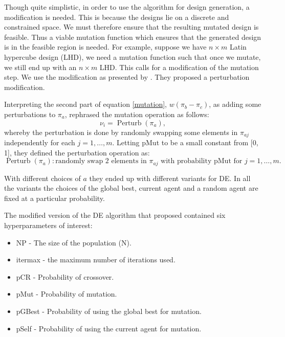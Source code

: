 \documentclass [PhD] {package/uclathes}
\begin{document}
Though quite simplistic, in order to use the algorithm for design generation, a modification is needed. This is because the designs lie on a discrete and constrained space. We must therefore ensure that the resulting mutated design is feasible. Thus a viable mutation function which ensures that the generated design is in the feasible region is needed. For example, suppose we have $n\times m$ Latin hypercube design (LHD), we need a mutation function such that once we mutate, we still end up with an $n \times m$ LHD. This calls for a modification of the mutation step. We use the modification as presented by \textcite{stokes2023metaheuristic}. They proposed a perturbation modification.

Interpreting the second part of equation \eqref{mutation}, $w(\pi_b - \pi_c)$, as adding some perturbations to $\pi_a$, \textcite{stokes2023metaheuristic} rephrased the mutation operation as follows:
\begin{equation}\label{eq:perturbation}
\nu_i = \operatorname{Perturb}(\pi_a),
\end{equation}
whereby the perturbation is done by randomly swapping some elements in $\pi_{aj}$ independently for each $j = 1,\dots, m$.
Letting pMut to be a small constant from [0, 1], they defined the perturbation operation as:
\[
\operatorname{Perturb}(\pi_a): \text{randomly swap 2 elements in }\pi_{aj} \text{ with probability  pMut  for } j = 1,\dots, m.
\]

With different choices of $a$ they ended up with different variants for DE. In all the variants the choices of the global best, current agent and a random agent are fixed at a particular probability.

The modified version of the DE algorithm that \textcite{stokes2023metaheuristic} proposed contained six hyperparameters of interest:
\begin{itemize}
    \item NP - The size of the population (N). %
    \item itermax -  the maximum number of iterations used. %
    \item pCR - Probability of crossover. %
    \item pMut - Probability of mutation. %
    \item pGBest - Probability of using the global best for mutation.
      \item pSelf - Probability of using the current agent for mutation.
\end{itemize}
\end{document}
